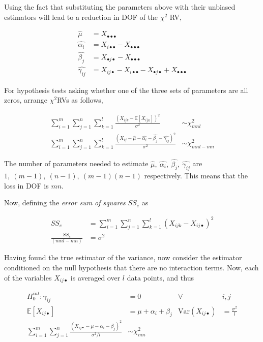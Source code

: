 Using the fact that substituting the parameters above with their unbiased estimators will lead to a reduction in DOF of the $ \chi^2 $ RV,

\begin{align}
	\widehat{\mu} &= X_{\bullet \bullet \bullet} \nonumber \\
	\widehat{\alpha_i} &= X_{i\bullet \bullet} - X_{\bullet \bullet \bullet} \nonumber \\
	\widehat{\beta_j} &= X_{\bullet j \bullet} - X_{\bullet \bullet \bullet} \nonumber \\
	\widehat{\gamma_{ij}} &= X_{ij\bullet} - X_{i\bullet \bullet} - X_{\bullet j \bullet} + X_{\bullet \bullet \bullet} 
\end{align}

For hypothesis tests asking whether one of the three sets of parameters are all zeros, arrange $ \chi^2 $RVs as follows,

\begin{align}
	\sum\limits_{i = 1}^{m} \sum\limits_{j = 1}^{n} \sum\limits_{k = 1}^{l}\frac{(X_{ijk} - \mathbb{E}[X_{ijk}])^2}{\sigma^2} &\sim \chi^2_{mnl} \nonumber \\
	\sum\limits_{i = 1}^{m} \sum\limits_{j = 1}^{n} \sum\limits_{k = 1}^{l} \frac{(X_{ij} - \widehat{\mu} - \widehat{\alpha_i} - \widehat{\beta_j} - \widehat{\gamma_{ij}})^2}{\sigma^2} &\sim \chi^2_{mnl - mn}
\end{align}

The number of parameters needed to estimate $ \widehat{\mu},\ \widehat{\alpha_i},\ \widehat{\beta_j},\  \widehat{\gamma_{ij}} $ are $ 1,\ (m-1),\ (n-1),\ (m-1)(n-1) $ respectively. This means that the loss in DOF is $ mn $.

Now, defining the \textit{error sum of squares} $ SS_e $ as

\begin{align}
	SS_e &= \sum\limits_{i = 1}^{m} \sum\limits_{j = 1}^{n} \sum\limits_{k = 1}^{l} (X_{ijk} - X_{ij\bullet})^2 \\
	\frac{SS_e}{(mnl  - mn)} &= \sigma^2
\end{align}

Having found the true estimator of the variance, now consider the estimator conditioned on the null hypothesis that there are no interaction terms. Now, each of the variables $ X_{ij\bullet} $ is averaged over $ l $ data points, and thus

\begin{align}
	H_0^{\textit{int}} : \gamma_{ij} &= 0 & \forall\ &i,j \nonumber \\
	\mathbb{E}[X_{ij\bullet}] &= \mu + \alpha_i + \beta_j & \mathrm{Var}(X_{ij\bullet}) &= \frac{\sigma^2}{l} \\
	\sum\limits_{i = 1}^{m} \sum\limits_{j = 1}^{n} \frac{(X_{ij\bullet} - \mu - \alpha_i - \beta_j)^2}{\sigma^2 / l} &\sim \chi^2_{mn}
\end{align}


